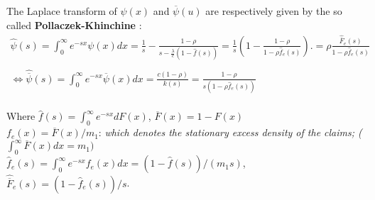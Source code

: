 The Laplace transform of $ \psi(x)$ and $\overline{\psi}(u)$ are respectively given by the so called \textbf{Pollaczek-Khinchine} :  \\
 \begin{equation}
 \begin{split}
 \widehat{\psi}(s)=\int_{0}^{\infty}e^{-sx}\psi(x)dx =\frac{1}{s}- \frac{1-\rho}{s-\frac{\lambda}{c}(1-\hat{f}(s))}=\frac{1}{s}\left( 1-\frac{1-\rho}{1-\rho \hat{f}_{e}(s)}\right).
 = \rho\frac{\widehat{\overline{F}}_{e}(s)}{1-\rho\hat{f}_{e}(s)} \\ \\
 \Leftrightarrow \widehat{\overline{\psi}}(s)= \int_{0}^{\infty}e^{-sx}\overline{\psi}(x)dx =\frac{c(1-\rho)}{k(s)}=\frac{1-\rho}{s(1-\rho\hat{f}_{e}(s))}
  \end{split}
 \end{equation} \\
 Where $\hat{f}(s)=\int_{0}^{\infty}e^{-sx}dF(x)$, $\overline{F}(x) =1-F(x)$ \\
  $f_{e}(x)= \overline{F}(x)/m_{1}$:\textit{ which denotes the stationary excess density of the claims; ($\int_{0}^{\infty} \overline{F}(x)dx = m_{1})$} \\
  $\hat{f}_{e}(s)= \int_{0}^{\infty}e^{-sx}f_{e}(x)dx =(1-\hat{f}(s))/(m_{1}s)$,$ \widehat{\overline{F}}_{e}(s)=(1-\hat{f}_{e}(s))/s$. \\
